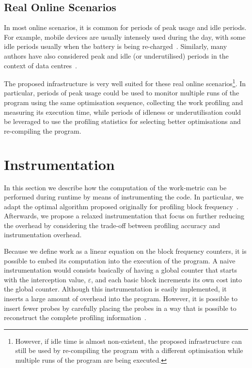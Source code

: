 \documentclass[sigplan,10pt]{acmart}
\theoremstyle{definition}
\begin{document}
\subsection{Real Online Scenarios}

In most online scenarios, it is common for periods of peak usage and idle periods.
For example, mobile devices are usually intensely used during the day, with some idle periods usually when the battery is being re-charged~\citep{mpeis16}.
Similarly, many authors have also considered peak and idle (or underutilised) periods in the context of data centres~\citep{armbrust10,chen12b}.

The proposed infrastructure is very well suited for these real online scenarios\footnote{
However, if idle time is almost non-existent, the proposed infrastructure can still be used by re-compiling the program with a different optimisation while multiple runs of the program are being executed.}.
In particular, periods of peak usage could be used to monitor multiple runs of the program using the same optimisation sequence, collecting the work profiling and measuring its execution time,
while periods of idleness or underutilisation could be leveraged to use the profiling statistics for selecting better optimisations and re-compiling the program.


\section{Instrumentation}

In this section we describe how the computation of the work-metric can be performed during runtime by means of instrumenting the code.
In particular, we adapt the optimal algorithm proposed originally for profiling block frequency~\cite{knuth73,ball94}.
Afterwards, we propose a relaxed instrumentation that focus on further reducing the overhead by considering the trade-off between profiling accuracy and instrumentation overhead.

Because we define work as a linear equation on the block frequency counters, it is possible to embed its computation into the execution of the program.
A naive instrumentation would consists basically of having a global counter that starts with the interception value, $\varepsilon$, and each basic block increments its own cost into the global counter.
Although this instrumentation is easily implemented, it inserts a large amount of overhead into the program.
However, it is possible to insert fewer probes by carefully placing the probes in a way that is possible to reconstruct the complete profiling information~\cite{knuth73,ball94}.
\end{document}
